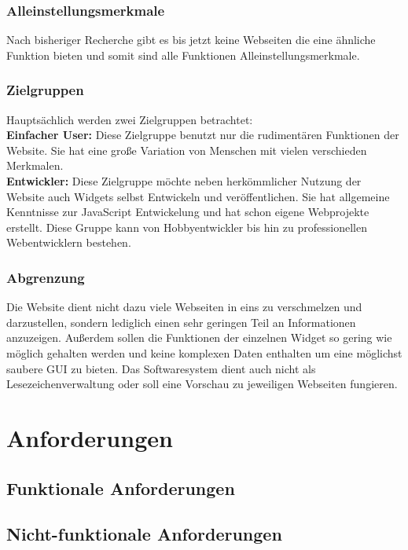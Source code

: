 		\subsubsection{Alleinstellungsmerkmale}  
			Nach bisheriger Recherche gibt es bis jetzt keine Webseiten die eine ähnliche Funktion bieten und somit sind alle Funktionen Alleinstellungsmerkmale.   
			
		\subsubsection{Zielgruppen}
			Hauptsächlich werden zwei Zielgruppen betrachtet: \\
			\textbf{Einfacher User: } Diese Zielgruppe benutzt nur die rudimentären Funktionen der Website. Sie hat eine große Variation von Menschen mit vielen verschieden Merkmalen.\\
			\textbf{Entwickler: }Diese Zielgruppe möchte neben herkömmlicher Nutzung der Website auch Widgets selbst Entwickeln und veröffentlichen. Sie hat allgemeine Kenntnisse zur JavaScript Entwickelung und hat schon eigene Webprojekte erstellt. Diese Gruppe kann von Hobbyentwickler bis hin zu professionellen Webentwicklern bestehen.   
			
		\subsubsection{Abgrenzung} 
			Die Website dient nicht dazu viele Webseiten in eins zu verschmelzen und darzustellen, sondern lediglich einen sehr geringen Teil an Informationen anzuzeigen. Außerdem sollen die Funktionen der einzelnen Widget so gering wie möglich gehalten werden und keine komplexen Daten enthalten um eine möglichst saubere GUI zu bieten. Das Softwaresystem dient auch nicht als Lesezeichenverwaltung oder soll eine Vorschau zu jeweiligen Webseiten fungieren.
				
\section{Anforderungen}

	\subsection{Funktionale Anforderungen}
	
	\subsection{Nicht-funktionale Anforderungen}
	
